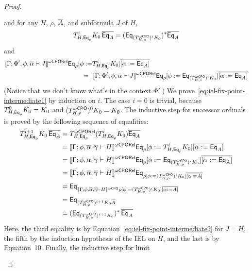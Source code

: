 \documentclass[acmsmall,review,anonymous]{acmart}
\theoremstyle{definition}
\begin{document}
\begin{proof}
\begin{itemize}
and for any $H$, $\rho$, $\overline{A}$, and subformula $J$ of $H$,
\begin{equation}\label{eq:iel-fix-point-intermediate1}
T^i_{H, \mathsf{Eq}_{\rho}} K_0\, \overline{\mathsf{Eq}_A} = (\mathsf{Eq}_{(T^{\omega\mathsf{CPO}}_{H, \rho})^i K_0})^*
\overline{\mathsf{Eq}_A}
\end{equation}
and 
\begin{equation}\label{eq:iel-fix-point-intermediate2}
\begin{split}
  \llbracket{\Gamma; \Phi', \phi, \overline{\alpha} \vdash J}\rrbracket^{{\omega\mathsf{CPORel}}}
\mathsf{Eq}_{\rho} [\phi := 
 & T^i_{H,\mathsf{Eq}_{\rho}} K_0] \overline{[\alpha :=
    \mathsf{Eq}_A]} \\
=\;\; & \llbracket{\Gamma; \Phi', \phi, \overline{\alpha} \vdash J}\rrbracket^{{\omega\mathsf{CPORel}}} \mathsf{Eq}_{\rho} [\phi
  := \mathsf{Eq}_{(T^{\omega\mathsf{CPO}}_{H,\rho})^i K_0}] \overline{[\alpha :=
    \mathsf{Eq}_A]}
\end{split}
\end{equation}
(Notice that we don't know what's in the context $\Phi'$.)  We
prove~\eqref{eq:iel-fix-point-intermediate1} by induction on $i$.  The
case $i=0$ is trivial, because $T^0_{H,\mathsf{Eq}_{\rho}} K_0 = K_0$ and
$(T^{\omega\mathsf{CPO}}_{H,\rho})^0 K_0 = K_0$. The inductive step for successor
ordinals is proved by the following sequence of equalities:
\[
\begin{split}
T^{i+1}_{H,\mathsf{Eq}_{\rho}} K_0\, \overline{\mathsf{Eq}_A}
&= T^{\omega\mathsf{CPORel}}_{H,\mathsf{Eq}_{\rho}} (T^i_{H,\mathsf{Eq}_{\rho}} K_0)
\overline{\mathsf{Eq}_A} \\ 
&= \llbracket{\Gamma; \phi, \overline{\alpha}, \overline{\gamma} \vdash H}\rrbracket^{{\omega\mathsf{CPORel}}} \mathsf{Eq}_{\rho} [\phi
  := T^i_{H, \mathsf{Eq}_{\rho}} K_0] \overline{[\alpha :=
    \mathsf{Eq}_A]} \\ 
&= \llbracket{\Gamma; \phi, \overline{\alpha}, \overline{\gamma} \vdash H}\rrbracket^{{\omega\mathsf{CPORel}}} \mathsf{Eq}_{\rho} [\phi
  := \mathsf{Eq}_{(T^{\omega\mathsf{CPO}}_{H,\rho})^i K_0}] \overline{[\alpha :=
    \mathsf{Eq}_A]} \\ 
&= \llbracket{\Gamma; \phi, \overline{\alpha}, \overline{\gamma} \vdash H}\rrbracket^{{\omega\mathsf{CPORel}}} \mathsf{Eq}_{\rho [\phi
    := (T^{\omega\mathsf{CPO}}_{H,\rho})^i K_0] \overline{[\alpha :=
      A]}} \\ 
&= \mathsf{Eq}_{\llbracket{\Gamma; \phi, \overline{\alpha}, \overline{\gamma} \vdash H}\rrbracket^{{\omega\mathsf{CPO}}} \rho [\phi
    := (T^{\omega\mathsf{CPO}}_{H,\rho})^i K_0] \overline{[\alpha :=
      A]}} \\ 
&= \mathsf{Eq}_{(T^{\omega\mathsf{CPO}}_{H,\rho})^{i+1} K_0 \overline{A}} \\ 
&= (\mathsf{Eq}_{(T^{\omega\mathsf{CPO}}_{H,\rho})^{i+1} K_0})^*\, \overline{\mathsf{Eq}_A} 
\end{split}
\]
Here, the third equality is by
Equation~\ref{eq:iel-fix-point-intermediate2} for $J = H$, the fifth
by the induction hypothesis of the IEL on $H$, and the last is by
Equation~10. {\color{blue} Finally, the inductive step for limit
}
\end{itemize}
\end{proof}
\end{document}
